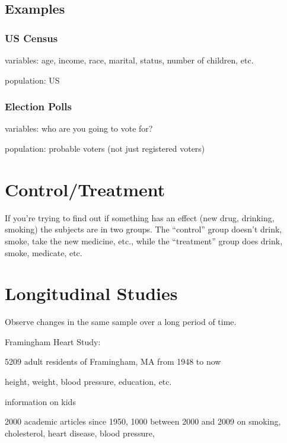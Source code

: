 \documentclass[landscape]{exam}
\begin{document}
  \subsection{Examples}

  \subsubsection{US Census}
  \begin{itemize*}
   \item variables: age, income, race, marital, status, number of children, etc.
   \item population: US
  \end{itemize*}

  \subsubsection{Election Polls}
  \begin{itemize*}
   \item variables: who are you going to vote for?
   \item population: probable voters (not just registered voters)
  \end{itemize*}

  \section{Control/Treatment}
  If you're trying to find out if something has an effect (new drug, drinking,
  smoking) the subjects are in two groups.  The ``control'' group doesn't
  drink, smoke, take the new medicine, etc., while the ``treatment'' group does
  drink, smoke, medicate, etc.

  \section{Longitudinal Studies} 
  Observe changes in the same sample over a long period of time.

  Framingham Heart Study:
  \begin{itemize*}
    \item 5209 adult residents of Framingham, MA from 1948 to now
    \item height, weight, blood pressure, education, etc.
    \item information on kids 
    \item 2000 academic articles since 1950, 1000 between 2000 and 2009 on
      smoking, cholesterol, heart disease, blood pressure, 
  \end{itemize*}
\end{document}
